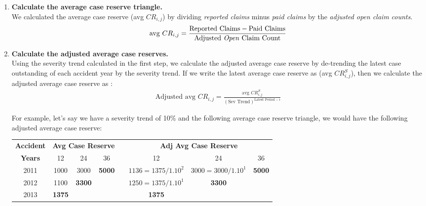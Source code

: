 \documentclass[11pt, english]{memoir}
\numberwithin{definition}{section}
\begin{document}
\begin{enumerate}
		
		
		\item \textbf{Calculate the average case reserve triangle.}\\
		We calculated the average case reserve (avg $ CR_{i,j} $) by dividing \emph{reported claims} minus \emph{paid claims} by the \emph{adjusted open claim counts}.
		\begin{align*}
		\text{avg } CR_{i,j} = \frac{\text{Reported Claims} - \text{Paid Claims}}{\text{Adjusted \emph{Open} Claim Count}}\\
		\end{align*}
		
		
		\item \textbf{Calculate the adjusted average case reserves.} \\
		Using the severity trend calculated in the first step, we calculate the adjusted average case reserve by de-trending the latest case outstanding of each accident year by the severity trend. If we write  the latest average case reserve as (avg $ CR_{i,j}^{S} $), then we calculate the adjusted average case reserve as : 
		\begin{align*}
		\text{Adjusted avg } CR_{i,j} = \frac{\text{avg }CR_{i,j}^{S}}{(\text{Sev Trend})^{\text{Latest Period} - i}}
		\end{align*}
		
		For example, let's say we have a severity trend of 10\% and the following average case reserve triangle, we would have the following adjusted average case reserve:\\
		
		\begin{tabularx}{0.9\textwidth}{cccclccc}
			\toprule
			\textbf{Accident} & \multicolumn{3}{c}{\textbf{Avg Case Reserve}} & & \multicolumn{3}{c}{\textbf{Adj Avg Case Reserve}}\\
			\textbf{Years} & 12 & 24 & 36 & & 12 & 24 & 36  \\
			\midrule
			2011 & 1000 & 3000 & \textbf{5000} & & $ 1136 = 1375/1.10^{2} $ & $ 3000 = 3000/1.10^{1} $ & \textbf{5000} \\
			2012 & 1100 & \textbf{3300} & & & $ 1250 = 1375/1.10^{1} $ & \textbf{3300} & \\
			2013 & \textbf{1375} & &  & & \textbf{1375} & & \\
			\bottomrule
		\end{tabularx}\\[10pt]
		
		
		

\end{enumerate}
\end{document}

